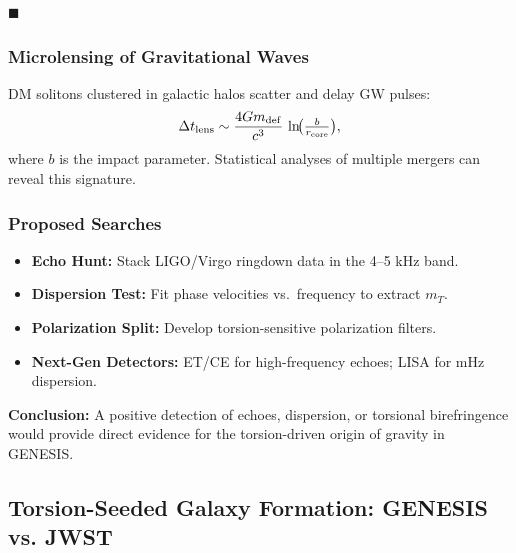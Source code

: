 \documentclass{article}
\begin{document}
\hfill $\blacksquare$



\subsubsection{ Microlensing of Gravitational Waves}
DM solitons clustered in galactic halos scatter and delay GW pulses:
\[
  \Delta t_{\rm lens} \sim \frac{4Gm_{\rm def}}{c^3}\,\ln\!\bigl(\tfrac{b}{r_{\rm core}}\bigr),
\]
where \(b\) is the impact parameter.  Statistical analyses of multiple mergers
can reveal this signature.

\subsubsection{Proposed Searches}
\begin{itemize}
  \item \textbf{Echo Hunt:} Stack LIGO/Virgo ringdown data in the 4–5 kHz band.
  \item \textbf{Dispersion Test:} Fit phase velocities vs.\ frequency to extract \(m_T\).
  \item \textbf{Polarization Split:} Develop torsion-sensitive polarization filters.
  \item \textbf{Next-Gen Detectors:} ET/CE for high-frequency echoes; LISA for mHz dispersion.
\end{itemize}

\noindent\textbf{Conclusion:}  
A positive detection of echoes, dispersion, or torsional birefringence would
provide direct evidence for the torsion-driven origin of gravity in GENESIS.

\medskip
\begin{center}
\end{center}
\medskip




\subsection{Torsion-Seeded Galaxy Formation: GENESIS vs. JWST}
\label{sec:galaxy_formation}
\end{document}
